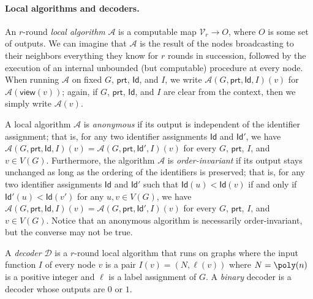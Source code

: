 \documentclass[11pt]{article}
\newcommand*{\ids}{\mathsf{Id}}
\newcommand*{\ports}{\mathsf{prt}}
\newcommand*{\view}{\mathsf{view}}
\begin{document}
\paragraph{Local algorithms and decoders.} 
An $r$-round \emph{local algorithm} $\mathcal{A}$ is a computable map
$\mathcal{V}_r \to O$, where $O$ is some set of outputs.
We can imagine that $\mathcal{A}$ is the result of the nodes broadcasting to
their neighbors everything they know for $r$ rounds in succession, followed by
the execution of an internal unbounded (but computable) procedure at every node.
When running $\mathcal{A}$ on fixed $G$, $\ports$, $\ids$, and $I$, we write
$\mathcal{A}(G,\ports,\ids,I)(v)$ for $\mathcal{A}(\view(v))$; again, if $G$,
$\ports$, $\ids$, and $I$ are clear from the context, then we simply write
$\mathcal{A}(v)$.

A local algorithm $\mathcal{A}$ is \emph{anonymous} if its output is independent
of the identifier assignment; that is, for any two identifier assignments $\ids$
and $\ids'$, we have $\mathcal{A}(G,\ports,\ids,I)(v) =
\mathcal{A}(G,\ports,\ids',I)(v)$ for every $G$, $\ports$, $I$, and $v \in
V(G)$. 
Furthermore, the algorithm $\mathcal{A}$ is \emph{order-invariant} if its output
stays unchanged as long as the ordering of the identifiers is preserved; that
is, for any two identifier assignments $\ids$ and $\ids'$ such that $\ids(u) <
\ids(v)$ if and only if $\ids'(u) < \ids(v')$ for any $u,v \in V(G)$, we have
$\mathcal{A}(G,\ports,\ids,I)(v) = \mathcal{A}(G,\ports,\ids',I)(v)$ for every
$G$, $\ports$, $I$, and $v \in V(G)$. 
Notice that an anonymous algorithm is necessarily order-invariant, but the
converse may not be true.

A \emph{decoder} $\mathcal{D}$ is a $r$-round local algorithm that runs on
graphs where the input function $I$ of every node $v$ is a pair $I(v) = (N,
\ell(v))$ where $N = \poly(n)$ is a positive integer and $\ell$ is a label
assignment of $G$. 
A \emph{binary} decoder is a decoder whose outputs are $0$ or $1$.
\end{document}
